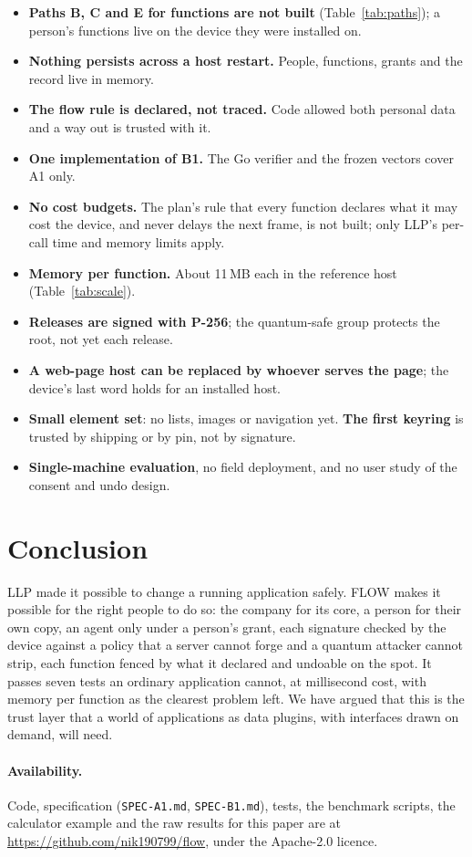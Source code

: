 \documentclass[10pt,twocolumn]{article}
\newcommand{\repo}{\url{https://github.com/nik190799/flow}}
\newcommand{\code}[1]{\texttt{#1}}
\begin{document}
\begin{itemize}
\item \textbf{Paths B, C and E for functions are not built} (Table~\ref{tab:paths}); a person's
functions live on the device they were installed on.
\item \textbf{Nothing persists across a host restart.} People, functions, grants and the record live
in memory.
\item \textbf{The flow rule is declared, not traced.} Code allowed both personal data and a way out is
trusted with it.
\item \textbf{One implementation of B1.} The Go verifier and the frozen vectors cover A1 only.
\item \textbf{No cost budgets.} The plan's rule that every function declares what it may cost the
device, and never delays the next frame, is not built; only LLP's per-call time and memory limits apply.
\item \textbf{Memory per function.} About 11\,MB each in the reference host (Table~\ref{tab:scale}).
\item \textbf{Releases are signed with P-256}; the quantum-safe group protects the root, not yet each
release.
\item \textbf{A web-page host can be replaced by whoever serves the page}; the device's last word holds
for an installed host.
\item \textbf{Small element set}: no lists, images or navigation yet. \textbf{The first keyring} is
trusted by shipping or by pin, not by signature.
\item \textbf{Single-machine evaluation}, no field deployment, and no user study of the consent and
undo design.
\end{itemize}

\section{Conclusion}

LLP made it possible to change a running application safely. FLOW makes it possible for the right
people to do so: the company for its core, a person for their own copy, an agent only under a
person's grant, each signature checked by the device against a policy that a server cannot forge and
a quantum attacker cannot strip, each function fenced by what it declared and undoable on the spot.
It passes seven tests an ordinary application cannot, at millisecond cost, with memory per function
as the clearest problem left. We have argued that this is the trust layer that a world of
applications as data plugins, with interfaces drawn on demand, will need.

\paragraph{Availability.} Code, specification (\code{SPEC-A1.md}, \code{SPEC-B1.md}), tests, the
benchmark scripts, the calculator example and the raw results for this paper are at \repo, under
the Apache-2.0 licence.



\end{document}

